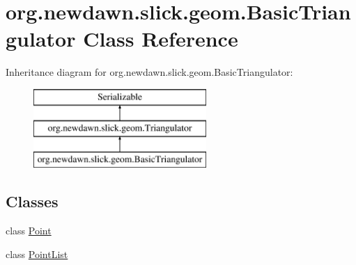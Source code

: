 \hypertarget{classorg_1_1newdawn_1_1slick_1_1geom_1_1_basic_triangulator}{}\section{org.\+newdawn.\+slick.\+geom.\+Basic\+Triangulator Class Reference}
\label{classorg_1_1newdawn_1_1slick_1_1geom_1_1_basic_triangulator}
Inheritance diagram for org.\+newdawn.\+slick.\+geom.\+Basic\+Triangulator\+:\begin{figure}[H]
\begin{center}
\leavevmode
\includegraphics[height=3.000000cm]{classorg_1_1newdawn_1_1slick_1_1geom_1_1_basic_triangulator}
\end{center}
\end{figure}
\subsection*{Classes}
\begin{DoxyCompactItemize}
\item 
class \mbox{\hyperlink{classorg_1_1newdawn_1_1slick_1_1geom_1_1_basic_triangulator_1_1_point}{Point}}
\item 
class \mbox{\hyperlink{classorg_1_1newdawn_1_1slick_1_1geom_1_1_basic_triangulator_1_1_point_list}{Point\+List}}
\end{DoxyCompactItemize}
